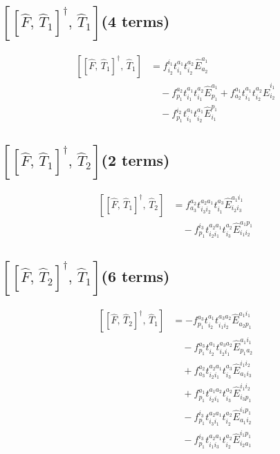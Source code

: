 \documentclass[11pt]{article}
\begin{document}
\subsection*{$\left[\left[\hat{F},\, \hat{T}_{1}\right]^{\dagger},\, \hat{T}_{1}\right]$\quad(4 terms)}
\begin{align}
\left[\left[\hat{F},\, \hat{T}_{1}\right]^{\dagger},\, \hat{T}_{1}\right] &= f^{i_{1}}_{i_{2}} t^{a_{1}}_{i_{1}} t^{a_{2}}_{i_{2}} \hat{E}^{a_{1}}_{a_{2}} \\
&\quad - f^{a_{2}}_{p_{1}} t^{a_{1}}_{i_{1}} t^{a_{2}}_{i_{1}} \hat{E}^{a_{1}}_{p_{1}} + f^{a_{1}}_{a_{2}} t^{a_{1}}_{i_{1}} t^{a_{2}}_{i_{2}} \hat{E}^{i_{1}}_{i_{2}} \\
&\quad - f^{i_{2}}_{p_{1}} t^{a_{1}}_{i_{1}} t^{a_{1}}_{i_{2}} \hat{E}^{p_{1}}_{i_{1}}
\end{align}
\subsection*{$\left[\left[\hat{F},\, \hat{T}_{1}\right]^{\dagger},\, \hat{T}_{2}\right]$\quad(2 terms)}
\begin{align}
\left[\left[\hat{F},\, \hat{T}_{1}\right]^{\dagger},\, \hat{T}_{2}\right] &= f^{a_{2}}_{a_{3}} t^{a_{2}a_{1}}_{i_{3}i_{2}} t^{a_{3}}_{i_{1}} \hat{E}^{a_{1}i_{1}}_{i_{2}i_{3}} \\
&\quad - f^{i_{3}}_{p_{1}} t^{a_{2}a_{1}}_{i_{2}i_{1}} t^{a_{2}}_{i_{3}} \hat{E}^{a_{1}p_{1}}_{i_{1}i_{2}}
\end{align}
\subsection*{$\left[\left[\hat{F},\, \hat{T}_{2}\right]^{\dagger},\, \hat{T}_{1}\right]$\quad(6 terms)}
\begin{align}
\left[\left[\hat{F},\, \hat{T}_{2}\right]^{\dagger},\, \hat{T}_{1}\right] &= - f^{a_{3}}_{p_{1}} t^{a_{1}}_{i_{2}} t^{a_{3}a_{2}}_{i_{1}i_{2}} \hat{E}^{a_{1}i_{1}}_{a_{2}p_{1}} \\
&\quad - f^{a_{3}}_{p_{1}} t^{a_{1}}_{i_{2}} t^{a_{3}a_{2}}_{i_{2}i_{1}} \hat{E}^{a_{1}i_{1}}_{p_{1}a_{2}} \\
&\quad + f^{a_{2}}_{a_{3}} t^{a_{2}a_{1}}_{i_{2}i_{1}} t^{a_{3}}_{i_{3}} \hat{E}^{i_{1}i_{2}}_{a_{1}i_{3}} \\
&\quad + f^{a_{1}}_{p_{1}} t^{a_{1}a_{2}}_{i_{2}i_{1}} t^{a_{2}}_{i_{3}} \hat{E}^{i_{1}i_{2}}_{i_{3}p_{1}} \\
&\quad - f^{i_{3}}_{p_{1}} t^{a_{2}a_{1}}_{i_{3}i_{1}} t^{a_{2}}_{i_{2}} \hat{E}^{i_{1}p_{1}}_{a_{1}i_{2}} \\
&\quad - f^{i_{3}}_{p_{1}} t^{a_{2}a_{1}}_{i_{1}i_{3}} t^{a_{2}}_{i_{2}} \hat{E}^{i_{1}p_{1}}_{i_{2}a_{1}}
\end{align}
\end{document}
